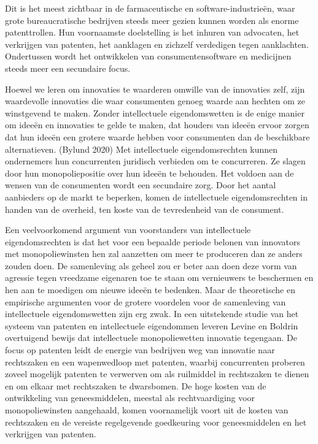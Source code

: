 \documentclass[
  a5paper,
  smalldemyvopaper,11pt,twoside,onecolumn,openright,extrafontsizes,
hidelinks]{memoir}
\begin{document}
Dit is het meest zichtbaar in de farmaceutische en software-industrieën,
waar grote bureaucratische bedrijven steeds meer gezien kunnen worden
als enorme patenttrollen. Hun voornaamste doelstelling is het inhuren
van advocaten, het verkrijgen van patenten, het aanklagen en zichzelf
verdedigen tegen aanklachten. Ondertussen wordt het ontwikkelen van
consumentensoftware en medicijnen steeds meer een secundaire focus.

Hoewel we leren om innovaties te waarderen omwille van de innovaties
zelf, zijn waardevolle innovaties die waar consumenten genoeg waarde aan
hechten om ze winstgevend te maken. Zonder intellectuele eigendomswetten
is de enige manier om ideeën en innovaties te gelde te maken, dat
houders van ideeën ervoor zorgen dat hun ideeën een grotere waarde
hebben voor consumenten dan de beschikbare alternatieven. (Bylund 2020)
Met intellectuele eigendomsrechten kunnen ondernemers hun concurrenten
juridisch verbieden om te concurreren. Ze slagen door hun
monopoliepositie over hun ideeën te behouden. Het voldoen aan de wensen
van de consumenten wordt een secundaire zorg. Door het aantal aanbieders
op de markt te beperken, komen de intellectuele eigendomsrechten in
handen van de overheid, ten koste van de tevredenheid van de consument.

Een veelvoorkomend argument van voorstanders van intellectuele
eigendomsrechten is dat het voor een bepaalde periode belonen van
innovators met monopoliewinsten hen zal aanzetten om meer te produceren
dan ze anders zouden doen. De samenleving als geheel zou er beter aan
doen deze vorm van agressie tegen vreedzame eigenaren toe te staan om
vernieuwers te beschermen en hen aan te moedigen om nieuwe ideeën te
bedenken. Maar de theoretische en empirische argumenten voor de grotere
voordelen voor de samenleving van intellectuele eigendomswetten zijn erg
zwak. In een uitstekende studie van het systeem van patenten en
intellectuele eigendommen leveren Levine en Boldrin overtuigend bewijs
dat intellectuele monopoliewetten innovatie tegengaan. De focus op
patenten leidt de energie van bedrijven weg van innovatie naar
rechtszaken en een wapenwedloop met patenten, waarbij concurrenten
proberen zoveel mogelijk patenten te verwerven om als ruilmiddel in
rechtszaken te dienen en om elkaar met rechtszaken te dwarsbomen. De
hoge kosten van de ontwikkeling van geneesmiddelen, meestal als
rechtvaardiging voor monopoliewinsten aangehaald, komen voornamelijk
voort uit de kosten van rechtszaken en de vereiste regelgevende
goedkeuring voor geneesmiddelen en het verkrijgen van patenten.
\end{document}
